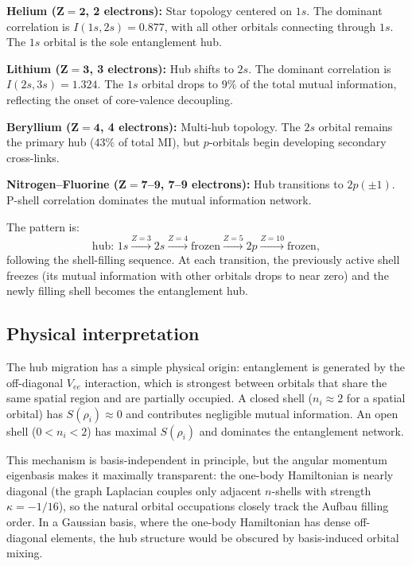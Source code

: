 \documentclass[twocolumn,pra,amsmath,amssymb,superscriptaddress]{revtex4-2}
\begin{document}
\medskip\noindent\textbf{Helium ($\mathbf{Z = 2}$, 2 electrons):}
Star topology centered on $1s$.  The dominant correlation is
$I(1s, 2s) = 0.877$, with all other orbitals connecting through
$1s$.  The $1s$ orbital is the sole entanglement hub.

\medskip\noindent\textbf{Lithium ($\mathbf{Z = 3}$, 3 electrons):}
Hub shifts to $2s$.  The dominant correlation is
$I(2s, 3s) = 1.324$.  The $1s$ orbital drops to $9\%$ of the
total mutual information, reflecting the onset of core-valence
decoupling.

\medskip\noindent\textbf{Beryllium ($\mathbf{Z = 4}$, 4 electrons):}
Multi-hub topology.  The $2s$ orbital remains the primary hub
($43\%$ of total MI), but $p$-orbitals begin developing secondary
cross-links.

\medskip\noindent\textbf{Nitrogen--Fluorine ($\mathbf{Z = 7}$--$\mathbf{9}$, 7--9 electrons):}
Hub transitions to $2p(\pm 1)$.  P-shell correlation dominates
the mutual information network.

\medskip
The pattern is:
\begin{equation}
  \text{hub: } 1s \xrightarrow{Z=3} 2s \xrightarrow{Z=4}
  \text{frozen} \xrightarrow{Z=5} 2p \xrightarrow{Z=10}
  \text{frozen},
  \label{eq:hub}
\end{equation}
following the shell-filling sequence.  At each transition, the
previously active shell freezes (its mutual information with other
orbitals drops to near zero) and the newly filling shell becomes
the entanglement hub.

\subsection{Physical interpretation}

The hub migration has a simple physical origin: entanglement is
generated by the off-diagonal $V_{ee}$ interaction, which is
strongest between orbitals that share the same spatial region and
are partially occupied.  A closed shell ($n_i \approx 2$ for a
spatial orbital) has $S(\rho_i) \approx 0$ and contributes
negligible mutual information.  An open shell
($0 < n_i < 2$) has maximal $S(\rho_i)$ and dominates the
entanglement network.

This mechanism is basis-independent in principle, but the angular
momentum eigenbasis makes it maximally transparent: the one-body
Hamiltonian is nearly diagonal (the graph Laplacian couples only
adjacent $n$-shells with strength $\kappa = -1/16$), so the
natural orbital occupations closely track the Aufbau filling
order.  In a Gaussian basis, where the one-body Hamiltonian has
dense off-diagonal elements, the hub structure would be obscured
by basis-induced orbital mixing.
\end{document}
